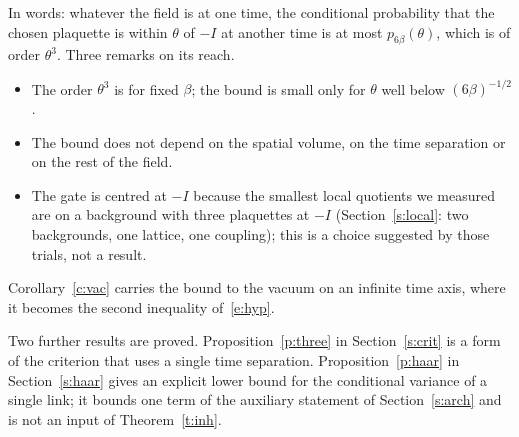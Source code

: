 In words: whatever the field is at one time, the conditional probability that the chosen plaquette is within
$\theta$ of $-I$ at another time is at most $p_{6\beta}(\theta)$, which is of order $\theta^3$. Three remarks
on its reach.
\begin{itemize}
\item The order $\theta^3$ is for fixed $\beta$; the bound is small only for $\theta$ well below
$(6\beta)^{-1/2}$.
\item The bound does not depend on the spatial volume, on the time separation or on the rest of the field.
\item The gate is centred at $-I$ because the smallest local quotients we measured are on a background with
three plaquettes at $-I$ (Section~\ref{s:local}: two backgrounds, one lattice, one coupling); this is a
choice suggested by those trials, not a result.
\end{itemize}
Corollary~\ref{c:vac} carries the bound to the vacuum on an infinite time axis, where it becomes the second
inequality of~\eqref{e:hyp}.

Two further results are proved. Proposition~\ref{p:three} in Section~\ref{s:crit} is a form of the criterion
that uses a single time separation. Proposition~\ref{p:haar} in Section~\ref{s:haar} gives an explicit lower
bound for the conditional variance of a single link; it bounds one term of the auxiliary statement of
Section~\ref{s:arch} and is not an input of Theorem~\ref{t:inh}.

